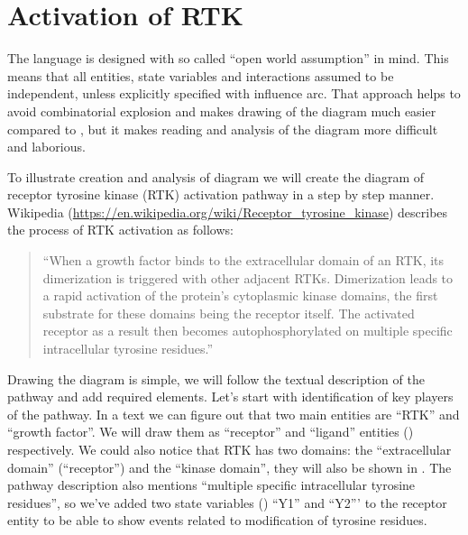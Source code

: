 \section{Activation of RTK}

The \SBGNERLone language is designed with so called ``open world assumption'' in mind. This means that all entities, state variables and interactions assumed to be independent, unless explicitly specified with influence arc. That approach helps to avoid combinatorial explosion and makes drawing of the diagram much easier compared to \SBGNPDLone, but it makes reading and analysis of the diagram more difficult and laborious.  

To illustrate creation and analysis of \SBGNERLone diagram we will create the diagram of receptor tyrosine kinase (RTK) activation pathway in a step by step manner. Wikipedia (\url{https://en.wikipedia.org/wiki/Receptor_tyrosine_kinase}) describes the process of RTK activation as follows:
\begin{quote}
``When a growth factor binds to the extracellular domain of an RTK, its dimerization is triggered with other adjacent RTKs. Dimerization leads to a rapid activation of the protein's cytoplasmic kinase domains, the first substrate for these domains being the receptor itself. The activated receptor as a result then becomes autophosphorylated on multiple specific intracellular tyrosine residues.''
\end{quote}

Drawing \SBGNERLone the diagram is simple, we will follow the textual description of the pathway and add required elements. Let's start with identification of key players of the pathway. In a text we can figure out that two main entities are ``RTK'' and ``growth factor''. We will draw them as ``receptor'' and ``ligand''  entities () respectively. We could also notice that RTK has two domains: the ``extracellular domain'' (``receptor'') and the ``kinase domain'', they will also be shown in . The pathway description also mentions ``multiple specific intracellular tyrosine residues'', so we've added two state variables () ``Y1'' and ``Y2''' to the receptor entity to be able to show events related to modification of tyrosine residues.  

